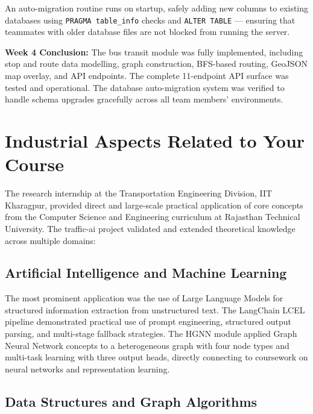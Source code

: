 \documentclass[12pt, a4paper]{report}
\begin{document}
An auto-migration routine runs on startup, safely adding new columns to existing databases using \texttt{PRAGMA table\_info} checks and \texttt{ALTER TABLE} — ensuring that teammates with older database files are not blocked from running the server.

\textbf{Week 4 Conclusion:} The bus transit module was fully implemented, including stop and route data modelling, graph construction, BFS-based routing, GeoJSON map overlay, and API endpoints. The complete 11-endpoint API surface was tested and operational. The database auto-migration system was verified to handle schema upgrades gracefully across all team members' environments.

\clearpage

\section*{Industrial Aspects Related to Your Course}

The research internship at the Transportation Engineering Division, IIT Kharagpur, provided direct and large-scale practical application of core concepts from the Computer Science and Engineering curriculum at Rajasthan Technical University. The traffic-ai project validated and extended theoretical knowledge across multiple domains:

\subsection*{Artificial Intelligence and Machine Learning}

The most prominent application was the use of Large Language Models for structured information extraction from unstructured text. The LangChain LCEL pipeline demonstrated practical use of prompt engineering, structured output parsing, and multi-stage fallback strategies. The HGNN module applied Graph Neural Network concepts to a heterogeneous graph with four node types and multi-task learning with three output heads, directly connecting to coursework on neural networks and representation learning.

\subsection*{Data Structures and Graph Algorithms}
\end{document}
